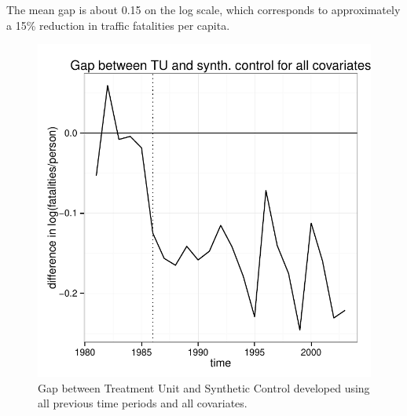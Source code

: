 \documentclass[letterpaper, 12pt]{article}
\begin{document}
The mean gap is about 0.15 on the log scale, which corresponds to approximately a 15\% reduction in traffic fatalities per capita. 


\begin{figure}[htbp]
\begin{center}
\includegraphics{img-gap-full.pdf}
\caption{Gap between Treatment Unit and Synthetic Control developed using all previous time periods and all covariates.}
\label{fig:c11}
\end{center}
\end{figure}
\end{document}
